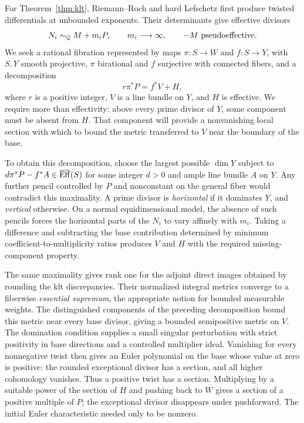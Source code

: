 For Theorem~\ref{thm:klt}, Riemann--Roch and hard Lefschetz first produce twisted differentials at unbounded exponents. Their determinants give effective divisors
\[
N_i\sim_{\mathbb Q}M+m_iP,\qquad m_i\longrightarrow\infty,
\qquad -M\text{ pseudoeffective}.
\]
We seek a rational fibration represented by maps $\pi:S\to W$ and $f:S\to Y$, with $S,Y$ smooth projective, $\pi$ birational and $f$ surjective with connected fibers, and a decomposition
\[
r\pi^*P=f^*V+H,
\]
where $r$ is a positive integer, $V$ is a line bundle on $Y$, and $H$ is effective. We require more than effectivity: above every prime divisor of $Y$, some component must be absent from $H$. That component will provide a nonvanishing local section with which to bound the metric transferred to $V$ near the boundary of the base.

To obtain this decomposition, choose the largest possible $\dim Y$ subject to $d\pi^*P-f^*A\in\overline{\operatorname{Eff}}(S)$ for some integer $d>0$ and ample line bundle $A$ on $Y$. Any further pencil controlled by $P$ and nonconstant on the general fiber would contradict this maximality. A prime divisor is \emph{horizontal} if it dominates $Y$, and \emph{vertical} otherwise. On a normal equidimensional model, the absence of such pencils forces the horizontal parts of the $N_i$ to vary affinely with $m_i$. Taking a difference and subtracting the base contribution determined by minimum coefficient-to-multiplicity ratios produces $V$ and $H$ with the required missing-component property.

The same maximality gives rank one for the adjoint direct images obtained by rounding the klt discrepancies. Their normalized integral metrics converge to a fiberwise \emph{essential supremum}, the appropriate notion for bounded measurable weights. The distinguished components of the preceding decomposition bound this metric near every base divisor, giving a bounded semipositive metric on $V$. The domination condition supplies a small singular perturbation with strict positivity in base directions and a controlled multiplier ideal. Vanishing for every nonnegative twist then gives an Euler polynomial on the base whose value at zero is positive: the rounded exceptional divisor has a section, and all higher cohomology vanishes. Thus a positive twist has a section. Multiplying by a suitable power of the section of $H$ and pushing back to $W$ gives a section of a positive multiple of $P$; the exceptional divisor disappears under pushforward. The initial Euler characteristic needed only to be nonzero.

